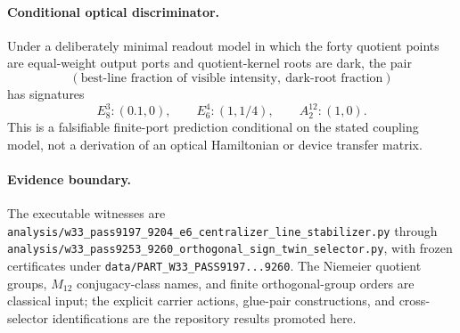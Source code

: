 \paragraph{Conditional optical discriminator.}
Under a deliberately minimal readout model in which the forty quotient points are equal-weight output ports and quotient-kernel roots are dark, the pair
\[
(\text{best-line fraction of visible intensity},\ \text{dark-root fraction})
\]
has signatures
\[
E_8^3:(0.1,0),\qquad E_6^4:(1,1/4),\qquad A_2^{12}:(1,0).
\]
This is a falsifiable finite-port prediction conditional on the stated coupling model, not a derivation of an optical Hamiltonian or device transfer matrix.

\paragraph{Evidence boundary.}
The executable witnesses are \texttt{analysis/w33\_pass9197\_9204\_e6\_centralizer\_line\_stabilizer.py} through \texttt{analysis/w33\_pass9253\_9260\_orthogonal\_sign\_twin\_selector.py}, with frozen certificates under \texttt{data/PART\_W33\_PASS9197...9260}.  The Niemeier quotient groups, $M_{12}$ conjugacy-class names, and finite orthogonal-group orders are classical input; the explicit carrier actions, glue-pair constructions, and cross-selector identifications are the repository results promoted here.
